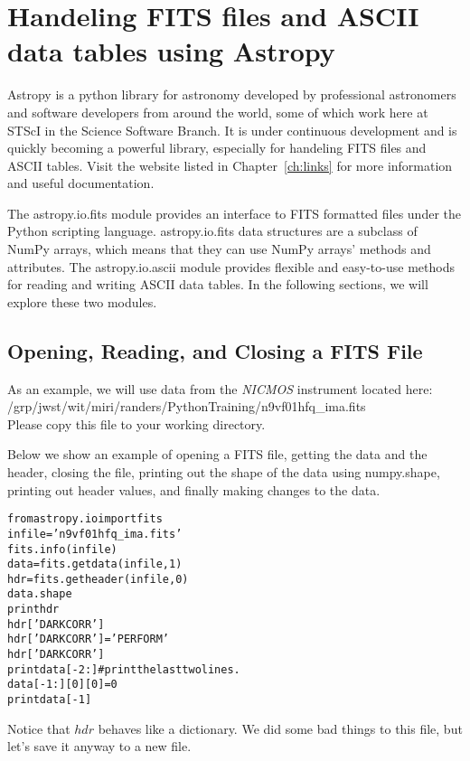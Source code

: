 \chapter{Handeling FITS files and ASCII data tables using Astropy}
\label{ch:fits}
Astropy is a python library for astronomy developed by professional astronomers
and software developers from around the world, some of which work here at STScI
in the Science Software Branch.  It is under continuous development and is quickly
becoming a powerful library, especially for handeling FITS files and ASCII tables.
Visit the website listed in Chapter~\ref{ch:links} for more information and useful
documentation.

The astropy.io.fits module provides an interface to FITS formatted files under the 
Python scripting language.  astropy.io.fits data structures are a subclass of NumPy 
arrays, which means that they can use NumPy arrays' methods and attributes.  The
astropy.io.ascii module provides flexible and easy-to-use methods for reading and 
writing ASCII data tables.  In the following sections, we will explore these two modules.
 
\section{Opening, Reading, and Closing a FITS File}
As an example, we will use data from the \emph{NICMOS} instrument located here:  \\
/grp/jwst/wit/miri/randers/PythonTraining/n9vf01hfq\_ima.fits \\ 
Please copy this file to your working directory. 

Below we show an example of opening a FITS file, getting
the data and the header, closing the file, printing out the shape of
the data using {\sf \small numpy.shape}, printing out header values,
and finally making changes to the data.

\begin{alltt}
\pytab from astropy.io import fits
\pytab infile = 'n9vf01hfq_ima.fits'
\pytab fits.info(infile)
\pytab data = fits.getdata(infile, 1) 
\pytab hdr = fits.getheader(infile, 0) 
\pytab data.shape
\pytab print hdr 
\pytab hdr['DARKCORR'] 
\pytab hdr['DARKCORR'] = 'PERFORM'
\pytab hdr['DARKCORR']
\pytab print data[-2:]  #print the last two lines.
\pytab data[-1:][0][0] = 0
\pytab print data[-1]
\end{alltt}

Notice that $hdr$ behaves like a dictionary.  We did some
bad things to this file, but let's save it anyway to a new file.

